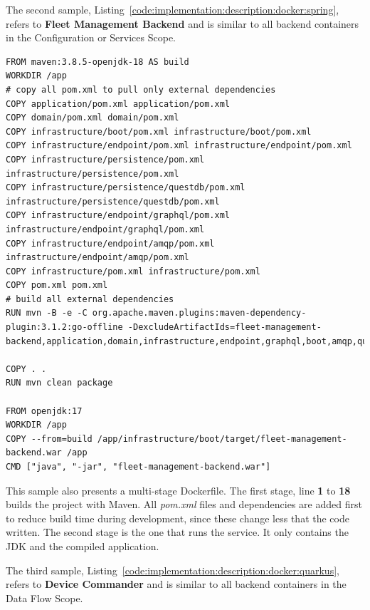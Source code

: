 The second sample, Listing~\ref{code:implementation:description:docker:spring}, refers to \textbf{Fleet Management Backend} and is similar to all backend containers in the Configuration or Services Scope.

\begin{lstlisting}[caption=Dockerfile for Fleet Management Backend, label={code:implementation:description:docker:spring}]
FROM maven:3.8.5-openjdk-18 AS build
WORKDIR /app
# copy all pom.xml to pull only external dependencies
COPY application/pom.xml application/pom.xml
COPY domain/pom.xml domain/pom.xml
COPY infrastructure/boot/pom.xml infrastructure/boot/pom.xml
COPY infrastructure/endpoint/pom.xml infrastructure/endpoint/pom.xml
COPY infrastructure/persistence/pom.xml infrastructure/persistence/pom.xml
COPY infrastructure/persistence/questdb/pom.xml infrastructure/persistence/questdb/pom.xml
COPY infrastructure/endpoint/graphql/pom.xml infrastructure/endpoint/graphql/pom.xml
COPY infrastructure/endpoint/amqp/pom.xml infrastructure/endpoint/amqp/pom.xml
COPY infrastructure/pom.xml infrastructure/pom.xml
COPY pom.xml pom.xml
# build all external dependencies
RUN mvn -B -e -C org.apache.maven.plugins:maven-dependency-plugin:3.1.2:go-offline -DexcludeArtifactIds=fleet-management-backend,application,domain,infrastructure,endpoint,graphql,boot,amqp,questdb

COPY . .
RUN mvn clean package

FROM openjdk:17
WORKDIR /app
COPY --from=build /app/infrastructure/boot/target/fleet-management-backend.war /app
CMD ["java", "-jar", "fleet-management-backend.war"]
\end{lstlisting}

This sample also presents a multi-stage Dockerfile. The first stage, line \textbf{1} to \textbf{18} builds the project with Maven. All \textit{pom.xml} files and dependencies are added first to reduce build time during development, since these change less that the code written. The second stage is the one that runs the  service. It only contains the \gls{JDK} and the compiled application.

The third sample, Listing~\ref{code:implementation:description:docker:quarkus}, refers to \textbf{Device Commander} and is similar to all backend containers in the Data Flow Scope.

